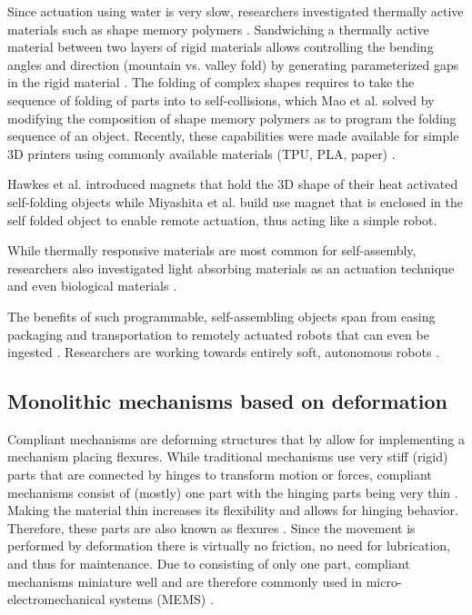 {Since actuation using water is very slow, researchers investigated thermally active materials \cite{Ge2014} such as shape memory polymers \cite{Yu2015}. Sandwiching a thermally active material between two layers of rigid materials allows controlling the bending angles and direction (mountain vs. valley fold) by generating parameterized gaps in the rigid material \cite{An2014}. The folding of complex shapes requires to take the sequence of folding of parts into to self-collisions, which Mao et al. \cite{Mao2015} solved by modifying the composition of shape memory polymers as to program the folding sequence of an object. Recently, these capabilities were made available for simple 3D printers using commonly available materials (TPU, PLA, paper) \cite{An2018, Wang2018}. 

Hawkes et al. \cite{Hawkes2010} introduced magnets that hold the 3D shape of their heat activated self-folding objects while Miyashita et al. \cite{Miyashita2015} build use magnet that is enclosed in the self folded object to enable remote actuation, thus acting like a simple robot. 

While thermally responsive materials are most common for self-assembly, researchers also investigated light absorbing materials as an actuation technique \cite{Tolley2013} and even biological materials \cite{Yao2015, Wang2017a}.

The benefits of such programmable, self-assembling objects span from easing packaging and transportation to remotely actuated robots \cite{Miyashita2015} that can even be ingested \cite{Miyashita2016}. Researchers are working towards entirely soft, autonomous robots \cite{Wehner2016}.



\subsection{Monolithic mechanisms based on deformation}

Compliant mechanisms are deforming structures that by allow for implementing a mechanism placing flexures. While traditional mechanisms use very stiff (rigid) parts that are connected by hinges to transform motion or forces, compliant mechanisms consist of (mostly) one part with the hinging parts being very thin \cite{Howell2013}. Making the material thin increases its flexibility and allows for hinging behavior. Therefore, these parts are also known as flexures \cite{Trease2005}. Since the movement is performed by deformation there is virtually no friction, no need for lubrication, and thus for maintenance. Due to consisting of only one part, compliant mechanisms miniature well and are therefore commonly used in micro-electromechanical systems (MEMS) \cite{Gafford2014}.

}
